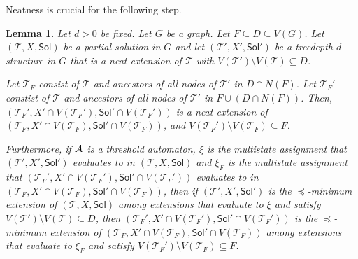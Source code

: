 \documentclass[11pt,a4paper]{article}
\newtheorem{lemma}[theorem]{Lemma}
\theoremstyle{definition}
\def\T{\mathcal{T}}
\def\Sol{\mathsf{Sol}}
\begin{document}
Neatness is crucial for the following step.
\begin{lemma}\label{lem:use-neatness}
Let $d > 0$ be fixed. Let $G$ be a graph. 
Let $F \subseteq D \subseteq V(G)$. 
Let $(\T,X,\Sol)$ be a partial solution in $G$ and
let $(\T',X',\Sol')$ be a treedepth-$d$ structure in $G$ that is a neat extension of $\T$
with $V(\T') \setminus V(\T) \subseteq D$.

Let $\T_F$ consist of $\T$ and ancestors
 of all nodes of $\T'$ in $D \cap N(F)$.
 Let $\T_F'$ constist of $\T$ and ancestors
 of all nodes of $\T'$ in $F \cup (D \cap N(F))$. 
 Then, $(\T_F', X' \cap V(\T_F'), \Sol' \cap V(\T_F'))$ is a neat extension
 of $(\T_F, X' \cap V(\T_F), \Sol' \cap V(\T_F))$, 
 and $V(\T_F') \setminus V(\T_F) \subseteq F$.

 Furthermore, if $\mathcal{A}$ is a threshold automaton,
 $\xi$ is the multistate assignment that $(\T',X',\Sol')$ evaluates
 to in $(\T,X,\Sol)$ and $\xi_F$ is the multistate assignment 
that $(\T_F', X' \cap V(\T_F'), \Sol' \cap V(\T_F'))$
evaluates to in $(\T_F, X' \cap V(\T_F), \Sol' \cap V(\T_F))$,
 then if $(\T',X',\Sol')$ is the $\preceq$-minimum extension
 of $(\T,X,\Sol)$ among extensions that evaluate to $\xi$ and satisfy
 $V(\T') \setminus V(\T) \subseteq D$, then 
$(\T_F', X' \cap V(\T_F'), \Sol' \cap V(\T_F'))$
is the $\preceq$-minimum extension of $(\T_F, X' \cap V(\T_F), \Sol' \cap V(\T_F))$
among extensions 
that evaluate to $\xi_F$ and satisfy $V(\T_F') \setminus V(\T_F) \subseteq F$. 
\end{lemma}
\end{document}
